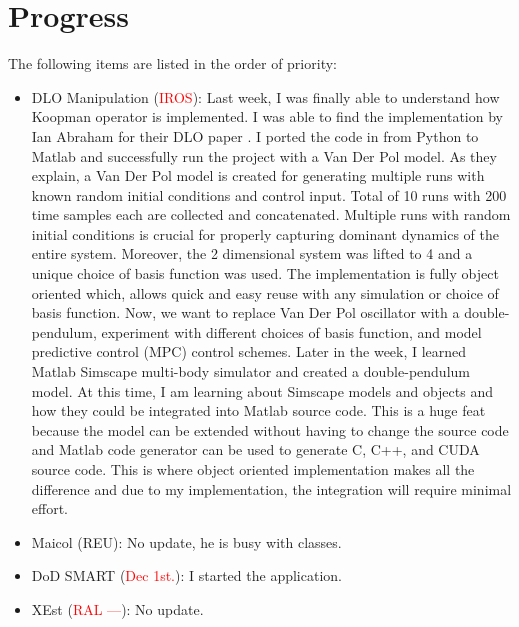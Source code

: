 \documentclass[11pt]{article}
\begin{document}
\newpage
\section{Progress}
The following items are listed in the order of priority:
\begin{itemize}
    \item DLO Manipulation (\textcolor{red}{IROS}):
    Last week, I was finally able to understand how Koopman operator is
    implemented. I was able to find the implementation by Ian Abraham for
    their DLO paper \cite{abraham2017model}. I ported the code in from Python
    to Matlab and successfully run the project with a Van Der Pol model. As they
    explain, a Van Der Pol model is created for generating multiple runs with
    known random initial conditions and control input. Total of 10 runs with
    200 time samples each are collected and concatenated. Multiple runs with
    random initial conditions is crucial for properly capturing dominant dynamics
    of the entire system. Moreover, the 2 dimensional system was lifted to 4
    and a unique choice of basis function was used. The implementation is
    fully object oriented which, allows quick and easy reuse with any simulation
    or choice of basis function. Now, we want to replace Van Der Pol oscillator
    with a double-pendulum, experiment with different choices of basis function,
    and model predictive control (MPC) control schemes.
    Later in the week, I learned Matlab Simscape multi-body simulator and
    created a double-pendulum model.
    At this time, I am learning about Simscape models and objects and how they
    could be integrated into Matlab source code. This is a huge feat because
    the model can be extended without having to change the source code and
    Matlab code generator can be used to generate C, C++, and CUDA source code.
    This is where object oriented implementation makes all the difference and
    due to my implementation, the integration will require minimal effort.\\
    \item Maicol (REU): No update, he is busy with classes.\\
    \item DoD SMART (\textcolor{red}{Dec 1st.}): I started the application.\\
    \item XEst (\textcolor{red}{RAL ---}): No update.\\
  \end{itemize}
\newpage

\newpage


\end{document}
